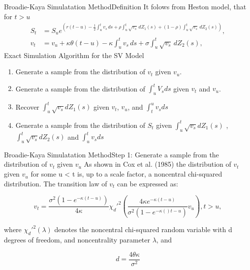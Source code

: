\begin{frame}{Broadie-Kaya Simulatation Method}{Definition}
    It folows from Heston model, that for $t > u$
    \begin{align}
         S_t &= S_u e^{\left( r(t-u)-\frac{1}{2} \int_{u}^{t} v_s \, ds  + \rho\int_{u}^{t} \sqrt{v_s} \, dZ_1(s) + (1-\rho)\int_{u}^{t} \sqrt{v_s} \, dZ_2(s)  \right)}, \label{BK:Price_int} \\
         v_t &= v_u + \kappa\theta(t-u) - \kappa \int_{u}^{t} v_s \, ds + \sigma\int_{u}^{t} \sqrt{v_s} \, dZ_2(s), \label{BK:Vol_int}
    \end{align}
    Exact Simulation Algorithm for the SV Model
    \begin{enumerate}
        \item[Step 1] Generate a sample from the distribution of $v_t$ given $v_u$.
        \item[Step 2] Generate a sample from the distribution of $\int_{u}^t V_s ds$ given $v_t$ and $v_u$.
        \item[Step 3] Recover $\int_{u}^t \sqrt{v_s} dZ_1(s)$ given $v_t$, $v_u$, and
        $\int_{t}^u v_s ds$
        \item[Step 4] Generate a sample from the distribution of $S_t$ given $\int_{u}^t \sqrt{v_s} dZ_1(s)$ , $\int_{u}^t \sqrt{v_s} dZ_2(s)$ and $\int_{u}^t v_s ds$
    \end{enumerate}
\end{frame}

\begin{frame}{Broadie-Kaya Simulatation Method}{Step 1: Generate a sample from the distribution of $v_t$ given $v_u$}
    As shown in Cox et al. (1985) the distribution of $v_t$ given $v_u$ for some u < t is, up to a  scale factor, a noncentral chi-squared distribution. The transition law of $v_t$ can be expressed as:

    \begin{equation}
        v_t = \frac{\sigma^2(1-e^{-\kappa(t-u)})}{4\kappa}\chi_d'^{2}\left(\frac{4\kappa e^{-\kappa(t-u)}}{\sigma^2(1-e^{-\kappa()t-u})} v_u  \right), t > u , \label{BK:vol_law}
    \end{equation}

    where $\chi_d'^{2}(\lambda)$ denotes the noncentral chi-squared random
    variable with d degrees of freedom, and noncentrality
    parameter $\lambda$, and

    \begin{equation}
        d = \frac{4\theta\kappa}{\sigma^2} \label{BK:vol_law:parameter}
    \end{equation}
    
\end{frame}


